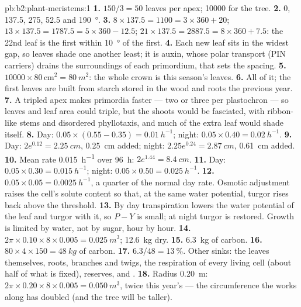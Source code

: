 \begin{solution}{pb:b2:plant-meristems:1}
\textbf{1.} $150/3 = 50$ leaves per apex; \num{10000} for the tree.
\textbf{2.} 0, 137.5, 275, 52.5 and \qty{190}{\degree}.
\textbf{3.} $8\times 137.5 = 1100 = 3\times 360 + 20$; $13\times 137.5
= 1787.5 = 5\times 360 - 12.5$; $21\times 137.5 = 2887.5 = 8\times 360
+ 7.5$: the 22nd leaf is the first within \qty{10}{\degree} of the
first.
\textbf{4.} Each new leaf sits in the widest gap, so leaves shade
one another least; it is auxin, whose polar transport (PIN
carriers) drains the surroundings of each primordium, that sets
the spacing.
\textbf{5.} $\num{10000}\times 80\,\text{cm}^{2} = \qty{80}{m^2}$: the
whole crown is this season's leaves.
\textbf{6.} All of it; the first leaves are built from starch stored
in the wood and roots the previous year.
\textbf{7.} A tripled apex makes primordia faster --- two or three per
plastochron --- so leaves and leaf area could triple, but the shoots
would be fasciated, with ribbon-like stems and disordered
phyllotaxis, and much of the extra leaf would shade itself.
\textbf{8.} Day: $0.05\times(0.55 - 0.35) = \qty{0.01}{h^{-1}}$; night:
$0.05\times 0.40 = \qty{0.02}{h^{-1}}$.
\textbf{9.} Day: $2e^{0.12} = \qty{2.25}{cm}$, \qty{0.25}{cm} added;
night: $2.25e^{0.24} = \qty{2.87}{cm}$, \qty{0.61}{cm} added.
\textbf{10.} Mean rate \qty{0.015}{h^{-1}} over \qty{96}{h}: $2e^{1.44}
= \qty{8.4}{cm}$.
\textbf{11.} Day: $0.05\times 0.30 = \qty{0.015}{h^{-1}}$; night:
$0.05\times 0.50 = \qty{0.025}{h^{-1}}$.
\textbf{12.} $0.05\times 0.05 = \qty{0.0025}{h^{-1}}$, a quarter of the
normal day rate. Osmotic adjustment raises the cell's solute content
so that, at the same water potential, turgor rises back above the
threshold.
\textbf{13.} By day transpiration lowers the water potential of the
leaf and turgor with it, so $P - Y$ is small; at night turgor is
restored. Growth is limited by water, not by sugar, hour by hour.
\textbf{14.} $2\pi\times 0.10\times 8\times 0.005 = \qty{0.025}{m^3}$;
\qty{12.6}{kg} dry.
\textbf{15.} \qty{6.3}{kg} of carbon.
\textbf{16.} $80\times 4\times 150 = \qty{48}{kg}$ of carbon.
\textbf{17.} $6.3/48 = \qty{13}{\%}$. Other sinks: the leaves
themselves, roots, branches and twigs, the respiration of every
living cell (about half of what is fixed), reserves,  and
.
\textbf{18.} Radius \qty{0.20}{m}: $2\pi\times 0.20\times 8\times
0.005 = \qty{0.050}{m^3}$, twice this year's --- the circumference
the  works along has doubled (and the tree will be taller).

\end{solution}
